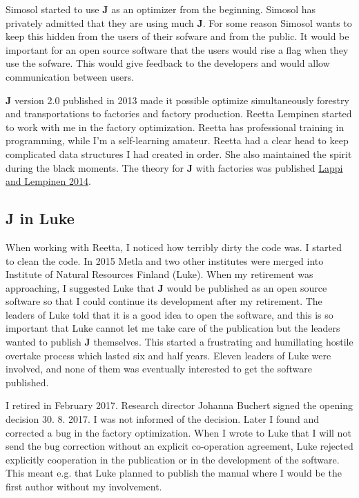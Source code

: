 Simosol started to use \textbf{J} as an 
optimizer from the beginning. Simosol has privately admitted 
that they are using much \textbf{J}. 
For some reason Simosol 
wants to keep this hidden from the users of their sofware and from the public. 
It would be important for an open source software that 
the users would rise a flag when they use the sofware. 
This would give feedback to the developers 
and would allow communication between users. 
 
\textbf{J} version 2.0 published in 2013 made it possible optimize simultaneously 
forestry and transportations to factories 
and factory production. 
Reetta Lempinen started to work with me in the factory optimization. 
Reetta has professional 
training in programming, while I'm a self-learning amateur. 
Reetta had a clear head to keep complicated data structures I had created in order. 
She also maintained the spirit during the black moments. The theory for \textbf{J} with factories was published 
\href{run:./lappilempinen.pdf}{Lappi and Lempinen 2014}. 
 
 
\subsection*{\textbf{J} in Luke} 
When working with Reetta, I noticed how terribly dirty the code was. I started to clean the 
code. 
In 2015 Metla and 
two other institutes were merged into Institute of Natural Resources Finland (Luke). 
When my retirement was approaching, I suggested Luke that \textbf{J} would be published as 
an open source software so that I could continue its development after my retirement. 
The leaders of Luke told that it is a good idea to open the software, and this is so important that 
Luke cannot let me take care of the publication but the leaders wanted to publish \textbf{J} 
themselves. This started a frustrating and humillating hostile overtake process which lasted six 
and half years. Eleven 
leaders of Luke were involved, 
and none of them was eventually interested to get the software published. 
 
I retired in February 2017.  Research director Johanna Buchert signed the opening decision 30. 8. 2017. 
I was not informed of the decision. Later I found and corrected a bug in the factory 
optimization. When I wrote to Luke that I will not send the bug correction without an explicit 
co-operation agreement, Luke rejected explicitly cooperation 
in the publication or in the development of 
the software. This meant e.g. that Luke planned to publish the manual where I would be the 
first author without my involvement. 
 
